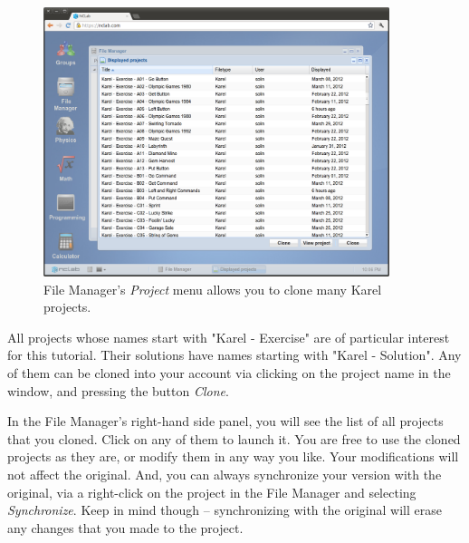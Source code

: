 \documentclass[article,A4,12pt]{llncs}
\begin{document}
\newpage
\begin{figure}[!ht]
\begin{center}
\includegraphics[width=0.9\textwidth]{img/cloning.png}
\end{center}
\caption{File Manager's {\em Project} menu allows you to clone many Karel projects.}
\label{fig:cloning}
\end{figure}
\noindent
All projects whose names start with "Karel - Exercise" are of particular interest 
for this tutorial. Their solutions have names starting with "Karel - Solution". 
Any of them can be cloned into your account via clicking on the project name in the window, 
and pressing the button {\em Clone}.

In the File Manager's right-hand side panel, you will see the list of all 
projects that you cloned. Click on any of them to launch it. You are free to 
use the cloned projects as they are, or modify them in any way you like. Your 
modifications will not affect the original. And, you can 
always synchronize your version with the original, via 
a right-click on the project in the File Manager and selecting {\em Synchronize}.
Keep in mind though -- synchronizing with the original will erase any changes that 
you made to the project.

%
\end{document}
